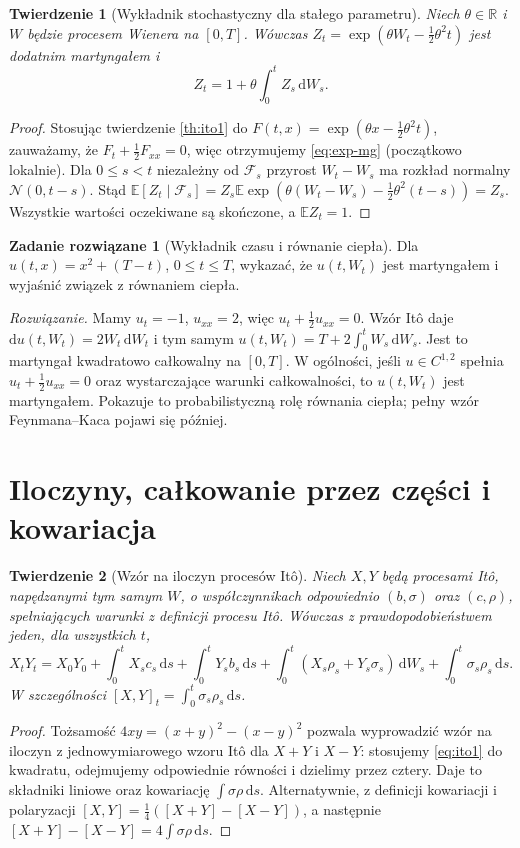 \documentclass[11pt,a4paper,oneside]{report}
\numberwithin{equation}{chapter}
\theoremstyle{plain}
\newtheorem{twierdzenie}{Twierdzenie}[chapter]
\theoremstyle{definition}
\newtheorem{zadanie}{Zadanie rozwiązane}[chapter]
\theoremstyle{remark}
\newcommand{\R}{\mathbb{R}}
\newcommand{\E}{\mathbb{E}}
\newcommand{\calF}{\mathcal{F}}
\newcommand{\dd}{\mathrm{d}}
\newcommand{\Normal}{\mathcal{N}}
\begin{document}
\begin{twierdzenie}[Wykładnik stochastyczny dla stałego parametru]
Niech $\theta\in\R$ i $W$ będzie procesem Wienera na
$[0,T]$. Wówczas $Z_t=\exp(\theta W_t-\tfrac12\theta^2t)$
jest dodatnim martyngałem i
\[
Z_t=1+\theta\int_0^t Z_s\,\dd W_s.
\tag{3.4}\label{eq:exp-mg}
\]
\end{twierdzenie}
\begin{proof}
Stosując twierdzenie \ref{th:ito1} do
$F(t,x)=\exp(\theta x-\frac12\theta^2t)$, zauważamy,
że $F_t+\frac12F_{xx}=0$, więc otrzymujemy
\eqref{eq:exp-mg} (początkowo lokalnie).
Dla $0\le s<t$ niezależny od $\calF_s$ przyrost
$W_t-W_s$ ma rozkład normalny $\Normal(0,t-s)$.
Stąd
$\E[Z_t\mid\calF_s]=Z_s\E\exp(\theta(W_t-W_s)
-\frac12\theta^2(t-s))=Z_s$.
Wszystkie wartości oczekiwane są skończone, a
$\E Z_t=1$.
\end{proof}

\begin{zadanie}[Wykładnik czasu i równanie ciepła]
Dla $u(t,x)=x^2+(T-t)$, $0\le t\le T$,
wykazać, że $u(t,W_t)$ jest martyngałem i
wyjaśnić związek z równaniem ciepła.

\emph{Rozwiązanie.} Mamy $u_t=-1$, $u_{xx}=2$,
więc $u_t+\frac12u_{xx}=0$. Wzór Itô daje
$\dd u(t,W_t)=2W_t\,\dd W_t$ i tym samym
$u(t,W_t)=T+2\int_0^tW_s\,\dd W_s$.
Jest to martyngał kwadratowo całkowalny na $[0,T]$.
W ogólności, jeśli $u\in C^{1,2}$ spełnia
$u_t+\frac12u_{xx}=0$ oraz wystarczające warunki
całkowalności, to $u(t,W_t)$ jest martyngałem.
Pokazuje to probabilistyczną rolę równania ciepła;
pełny wzór Feynmana--Kaca pojawi się później.
\end{zadanie}

\section{Iloczyny, całkowanie przez części i kowariacja}
\begin{twierdzenie}[Wzór na iloczyn procesów Itô]
\label{th:ito-product}
Niech $X,Y$ będą procesami Itô, napędzanymi tym samym
$W$, o współczynnikach odpowiednio $(b,\sigma)$ oraz
$(c,\rho)$, spełniających warunki z definicji procesu Itô.
Wówczas z prawdopodobieństwem jeden, dla wszystkich $t$,
\[
X_tY_t=X_0Y_0+\int_0^tX_sc_s\,\dd s
+\int_0^tY_sb_s\,\dd s
+\int_0^t(X_s\rho_s+Y_s\sigma_s)\,\dd W_s
+\int_0^t\sigma_s\rho_s\,\dd s.
\tag{3.5}\label{eq:ito-product}
\]
W szczególności $[X,Y]_t=\int_0^t\sigma_s\rho_s\,\dd s$.
\end{twierdzenie}
\begin{proof}
Tożsamość $4xy=(x+y)^2-(x-y)^2$ pozwala wyprowadzić
wzór na iloczyn z jednowymiarowego wzoru Itô dla
$X+Y$ i $X-Y$: stosujemy \eqref{eq:ito1} do kwadratu,
odejmujemy odpowiednie równości i dzielimy przez cztery.
Daje to składniki liniowe oraz kowariację
$\int\sigma\rho\,\dd s$. Alternatywnie, z definicji
kowariacji i polaryzacji $[X,Y]=\frac14([X+Y]-[X-Y])$,
a następnie $[X+Y]-[X-Y]=4\int\sigma\rho\,\dd s$.
\end{proof}
\end{document}
